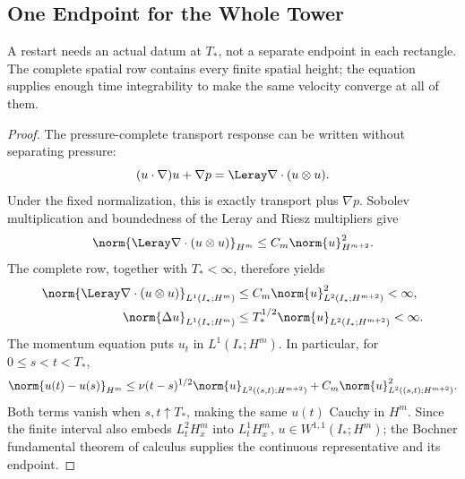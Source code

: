 \subsection{One Endpoint for the Whole Tower}\label{sub:OneEndpointForTheWholeTower}

A restart needs an actual datum at \(T_*\), not a separate endpoint in each
rectangle.  The complete spatial row contains every finite spatial height; the
equation supplies enough time integrability to make the same velocity converge
at all of them.


\begin{proof}
The pressure-complete transport response can be written without separating
pressure:
\[
  (u\cdot\nabla)u+\nabla p
  =\Leray\nabla\cdot(u\otimes u).
\]
Under the fixed normalization, this is exactly transport plus \(\nabla p\).
Sobolev multiplication and boundedness of the Leray and Riesz multipliers give
\[
  \norm{\Leray\nabla\cdot(u\otimes u)}_{H^m}
  \leq
  C_m\norm{u}_{H^{m+2}}^2.
\]
The complete row, together with \(T_*<\infty\), therefore yields
\begin{align*}
  \norm{\Leray\nabla\cdot(u\otimes u)}_{L^1(I_*;H^m)}
  &\leq
  C_m\norm{u}_{L^2(I_*;H^{m+2})}^{2}
  <\infty,\\
  \norm{\Delta u}_{L^1(I_*;H^m)}
  &\leq
  T_*^{1/2}\norm{u}_{L^2(I_*;H^{m+2})}
  <\infty.
\end{align*}
The momentum equation puts \(u_t\) in \(L^1(I_*;H^m)\).  In particular, for
\(0\leq s<t<T_*\),
\[
  \norm{u(t)-u(s)}_{H^m}
  \leq
  \nu(t-s)^{1/2}\norm{u}_{L^2((s,t);H^{m+2})}
  +C_m\norm{u}_{L^2((s,t);H^{m+2})}^{2}.
\]
Both terms vanish when \(s,t\uparrow T_*\), making the same \(u(t)\) Cauchy
in \(H^m\).  Since the finite interval also embeds \(L^2_tH^m_x\) into
\(L^1_tH^m_x\), \(u\in W^{1,1}(I_*;H^m)\); the Bochner fundamental theorem of
calculus supplies the continuous representative and its endpoint.
\end{proof}

